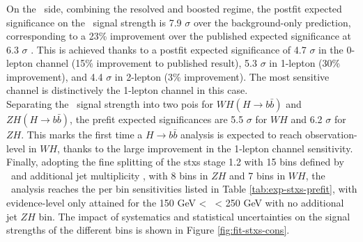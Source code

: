\subsubsection{\boldvhb}
On the \vhb\ side, combining the resolved and boosted regime, the postfit expected significance on the \vhb\ signal strength is 7.9 $\sigma$ over the background-only prediction, corresponding to a 23\% improvement over the published expected significance at 6.3 $\sigma$ \cite{ATLAS:2021wqh}. This is achieved thanks to a postfit expected significance of 4.7 $\sigma$ in the 0-lepton channel (15\% improvement to published result), 5.3 $\sigma$ in 1-lepton (30\% improvement), and 4.4 $\sigma$ in 2-lepton (3\% improvement). The most sensitive channel is distinctively the 1-lepton channel in this case. \\%

Separating the \vhb\ signal strength into two \gls{poi}s for $WH(H \rightarrow{b\bar{b}})$ and $ZH(H \rightarrow{b\bar{b}})$, the prefit expected significances are 5.5 $\sigma$ for $WH$ and 6.2 $\sigma$ for $ZH$. This marks the first time a $H \rightarrow b\bar{b}$ analysis is expected to reach observation-level in $WH$, thanks to the large improvement in the 1-lepton channel sensitivity. \\

Finally, adopting the fine splitting of the \gls{stxs} stage 1.2 with 15 bins defined by \ptv\ and additional jet multiplicity \nj, with 8 bins in $ZH$ and 7 bins in $WH$, the \vhb\ analysis reaches the per bin sensitivities listed in Table \ref{tab:exp-stxs-prefit}, with evidence-level only attained for the 150 GeV < \ptv\ < 250 GeV with no additional jet $ZH$ bin. The impact of systematics and statistical uncertainties on the signal strengths of the different bins is shown in Figure \ref{fig:fit-stxs-cons}.


